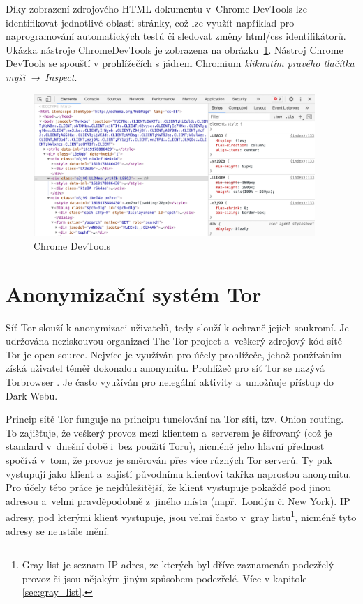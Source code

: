 Díky zobrazení zdrojového HTML dokumentu v~Chrome DevTools lze identifikovat jednotlivé oblasti stránky, což lze využít například pro naprogramování automatických testů či sledovat změny html/css identifikátorů. Ukázka nástroje ChromeDevTools je zobrazena na obrázku~\ref{img:chrome_devtools}. Nástroj Chrome DevTools se spouští v prohlížečích s jádrem Chromium \textit{kliknutím pravého tlačítka myši~→~Inspect}.

\begin{figure}[hbt]
	\centering
	\includegraphics[width=0.95\textwidth]{images/chrome_devtools.jpg}
	\caption{Chrome DevTools}
	\label{img:chrome_devtools}
\end{figure}

\section{Anonymizační systém Tor}
\label{sec:tor_browser}
Síť Tor slouží k anonymizaci uživatelů, tedy slouží k ochraně jejich soukromí. Je udržována neziskouvou organizací The Tor project a~veškerý zdrojový kód sítě Tor je open source. Nejvíce je využíván pro účely prohlížeče, jehož používáním získá uživatel téměř dokonalou anonymitu. Prohlížeč pro síť Tor se nazývá Torbrowser \cite{bib:tor_browser}. Je často využíván pro nelegální aktivity a~umožňuje přístup do Dark Webu.

Princip sítě Tor funguje na principu tunelování na Tor síti, tzv. Onion routing. To zajišťuje, že veškerý provoz mezi klientem a~serverem je šifrovaný (což je standard v~dnešní době i~bez použití Toru), nicméně jeho hlavní přednost spočívá v~tom, že provoz je směrován přes více různých Tor serverů. Ty pak vystupují jako klient a~zajistí původnímu klientovi takřka naprostou anonymitu. Pro účely této práce je nejdůležitější, že klient vystupuje pokaždé pod jinou adresou a~velmi pravděpodobně z~jiného místa (např.~Londýn či New York). IP adresy, pod kterými klient vystupuje, jsou velmi často v~gray listu\footnote{Gray list je seznam IP adres, ze kterých byl dříve zaznamenán podezřelý provoz či jsou nějakým jiným způsobem podezřelé. Více v kapitole \ref{sec:gray_list}.}, nicméně tyto adresy se neustále mění. 

